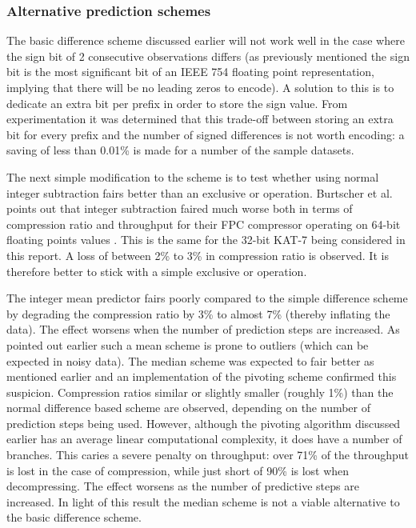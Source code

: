   \subsubsection{Alternative prediction schemes}
  The basic difference scheme discussed earlier will not work well in the case where the sign bit of 2 consecutive observations differs (as previously mentioned the sign bit is the most significant bit of an IEEE 754 
  floating point representation, implying that there will be no leading zeros to encode). A solution to this is to dedicate an extra bit per prefix in order to store the sign value. From experimentation it was determined that
  this trade-off between storing an extra bit for every prefix and the number of signed differences is not worth encoding: a saving of less than 0.01\% is made for a number of the sample datasets. 
  
  The next simple modification to the scheme is to test whether using normal integer subtraction fairs better than an exclusive or operation. Burtscher et al. points out that integer subtraction faired much worse both in terms of
  compression ratio and throughput for their FPC compressor operating on 64-bit floating points values \cite{4589203}. This is the same for the 32-bit KAT-7 being considered in this report. A loss of between 2\% to 3\% in 
  compression ratio is observed. It is therefore better to stick with a simple exclusive or operation.
  
  The integer mean predictor fairs poorly compared to the simple difference scheme by degrading the compression ratio by 3\% to almost 7\% (thereby inflating the data). The effect worsens when the number of prediction 
  steps are increased. As pointed out earlier such a mean scheme is prone to outliers (which can be expected in noisy data). The median scheme was expected to fair better as mentioned earlier and an implementation of the pivoting 
  scheme confirmed this suspicion. Compression ratios similar or slightly smaller (roughly 1\%) than the normal difference based scheme are observed, depending on the number of prediction steps being used. However, although the 
  pivoting algorithm discussed earlier has an average linear computational complexity, it does have a number of branches. This caries a severe penalty on throughput: over 
  71\% of the throughput is lost in the case of compression, while just short of 90\% is lost when decompressing. The effect worsens as the number of predictive steps are increased. In light of this result the median scheme is not
  a viable alternative to the basic difference scheme.
  

